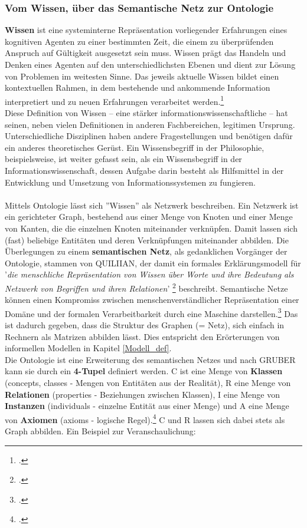 \documentclass[12pt,a4paper]{article}
\begin{document}
\subsubsection{Vom Wissen, über das Semantische Netz zur Ontologie}
\textbf{Wissen} ist eine systeminterne Repräsentation vorliegender Erfahrungen eines kognitiven Agenten zu einer bestimmten Zeit, die einem zu überprüfenden Anspruch auf Gültigkeit ausgesetzt sein muss. Wissen prägt das Handeln und Denken eines Agenten auf den unterschiedlichsten Ebenen und dient zur Lösung von Problemen im weitesten Sinne. Das jeweils aktuelle Wissen bildet einen kontextuellen Rahmen, in dem bestehende und ankommende Information interpretiert und zu neuen Erfahrungen verarbeitet werden.\footcite{favre2001information}
\\
Diese Definition von Wissen -- eine stärker informationswissenschaftliche -- hat seinen, neben vielen Definitionen in anderen Fachbereichen, legitimen Ursprung. Unterschiedliche Disziplinen haben andere Fragestellungen und benötigen dafür ein anderes theoretisches Gerüst. Ein Wissensbegriff in der Philosophie, beispielsweise, ist weiter gefasst sein, als ein Wissensbegriff in der Informationswissenschaft, dessen Aufgabe darin besteht als Hilfsmittel in der Entwicklung und Umsetzung von Informationssystemen zu fungieren. 
\\
\\
Mittels Ontologie lässt sich ''Wissen'' als Netzwerk beschreiben. Ein Netzwerk ist ein gerichteter Graph, bestehend aus einer Menge von Knoten und einer Menge von Kanten, die die einzelnen Knoten miteinander verknüpfen. Damit lassen sich (fast) beliebige Entitäten und deren Verknüpfungen miteinander abbilden. Die Überlegungen zu einem \textbf{semantischen Netz}, als gedanklichen Vorgänger der Ontologie, stammen von QUILIIAN, der damit ein formales Erklärungsmodell für '\textit{die menschliche Repräsentation von Wissen über Worte und ihre Bedeutung als Netzwerk von Begriffen und ihren Relationen}' \footcite{stuckenschmidt2009ontologien} beschreibt. Semantische Netze können einen Kompromiss zwischen menschenverständlicher Repräsentation einer Domäne  und der formalen Verarbeitbarkeit durch eine Maschine darstellen.\footcite{reichenberger2010grundlagen} Das ist dadurch gegeben, dass die Struktur des Graphen (= Netz), sich einfach in Rechnern als Matrizen abbilden lässt. Dies entspricht den Erörterungen von informellen Modellen in Kapitel \ref{Modell_def}.
\\
Die Ontologie ist eine Erweiterung des semantischen Netzes und nach GRUBER kann sie durch ein \textbf{4-Tupel} definiert werden. C ist eine Menge von \textbf{Klassen} (concepts, classes - Mengen von Entitäten aus der Realität), R eine Menge von \textbf{Relationen} (properties - Beziehungen zwischen Klassen), I eine Menge von \textbf{Instanzen} (individuals - einzelne Entität aus einer Menge) und A eine Menge von \textbf{Axiomen} (axioms - logische Regel).\footcite{joostbreukera2009flood} C und R lassen sich dabei stets als Graph abbilden. Ein Beispiel zur Veranschaulichung: 
\end{document}
